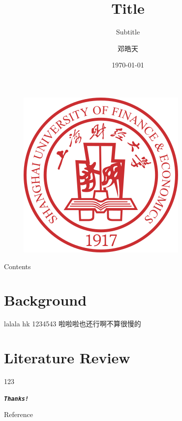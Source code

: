 \documentclass[UTF8, 16pt]{beamer}
\author[Haotian Deng] %
{
邓皓天
}
\title[Title]{Title}
\subtitle{Subtitle}
\institute[SUFE]
{
上海财经大学金融学院
}
\date[VLC 2021]
{\today}
\begin{document}
\begin{CJK*}{UTF8}{gbsn}

\begin{frame}[noframenumbering]
	\titlepage
	\vspace{-0.5cm}
    \begin{figure}[htpb] 
        \begin{center}
            \includegraphics[width=0.19 \linewidth]{sufe_logo.png}
        \end{center}  
    \end{figure}
\end{frame}

\begin{frame}{Contents}
	\tableofcontents[sectionstyle=show,
 	subsectionstyle=show/shaded/hide,
 	subsubsectionstyle=show/shaded/hide]
\end{frame}

\section{Background}

\begin{frame}{lalala}
	\textcolor{sufered}{hk}
	1234543
	\cite{Greiner2008}
	啦啦啦也还行啊不算很慢的
\end{frame}

\section{Literature Review}
\begin{frame}
	123
\end{frame}



\begin{frame}[allowframebreaks]%
	\begin{center}
		\Huge\textbf{\textit{\texttt{Thanks!}}}
	\end{center}
\end{frame}

\begin{frame}{Reference}
	\addtocounter{framenumber}{-1}
	\printbibliography %
\end{frame}


\end{CJK*}
\end{document}
